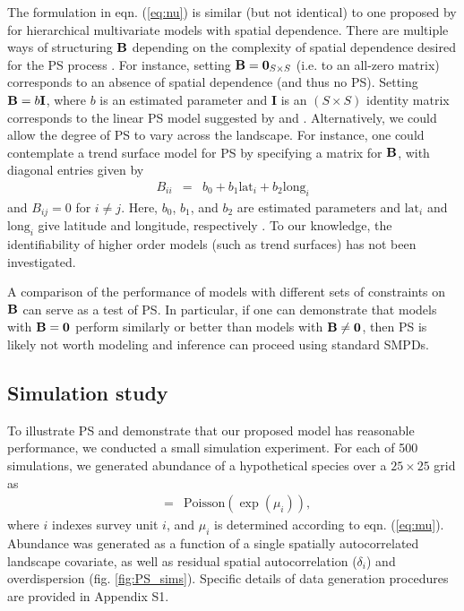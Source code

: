 \documentclass[times,mee,doublespace,]{besauth2}
\begin{document}
 The formulation in eqn. (\ref{eq:nu}) is similar (but not identical) to one proposed by \citet{RoyleBerliner1999} for hierarchical multivariate models with spatial dependence.  There are multiple ways of structuring ${\bf B}$ depending on the complexity of spatial dependence desired for the PS process \citep{RoyleBerliner1999}.  For instance, setting ${\bf B} = {\bf 0}_{S \times S}$ (i.e. to an all-zero matrix) corresponds to an absence of spatial dependence (and thus no PS).  Setting ${\bf B} = b {\bf I}$, where $b$ is an estimated parameter and {\bf I} is an $(S \times S)$ identity matrix corresponds to the linear PS model suggested by \citet{DiggleEtAl2010} and \citet{PatiEtAl2011}.  Alternatively, we could allow the degree of PS to vary across the landscape.  For instance, one could contemplate a trend surface model for PS by specifying a matrix for ${\bf B}$, with diagonal entries given by
 \begin{eqnarray*}
   \label{eq:ts}
   B_{ii} & = & b_0 + b_1 \textrm{lat}_i + b_2 \textrm{long}_i
 \end{eqnarray*}
 and $B_{ij}=0$ for $i \ne j$.  Here, $b_0$, $b_1$, and $b_2$ are estimated parameters and $\textrm{lat}_i$ and $\textrm{long}_i$ give latitude and longitude, respectively \citep{RoyleBerliner1999}.  To our knowledge, the identifiability of higher order models (such as trend surfaces) has not been investigated.

A comparison of the performance of models with different sets of constraints on ${\bf B}$ can serve as a test of PS.  In particular, if one can demonstrate that models with ${\bf B}={\bf 0}$ perform similarly or better than models with ${\bf B} \ne {\bf 0}$, then PS is likely not worth modeling and inference can proceed using standard SMPDs.


\subsection{Simulation study}

To illustrate PS and demonstrate that our proposed model has reasonable performance, we conducted a small simulation experiment.  For each of 500 simulations, we generated abundance of a hypothetical species over a $25 \times 25$ grid as
\begin{eqnarray*}
  [N_i|\mu_i] & = & \textrm{Poisson}(\exp(\mu_i)),
\end{eqnarray*}
where $i$ indexes survey unit $i$, and $\mu_i$ is determined according to eqn. (\ref{eq:mu}). Abundance was generated as a function of a single spatially autocorrelated landscape covariate, as well as residual spatial autocorrelation ($\delta_i$) and overdispersion (fig. \ref{fig:PS_sims}). Specific details of data generation procedures are provided in Appendix S1.
\end{document}

